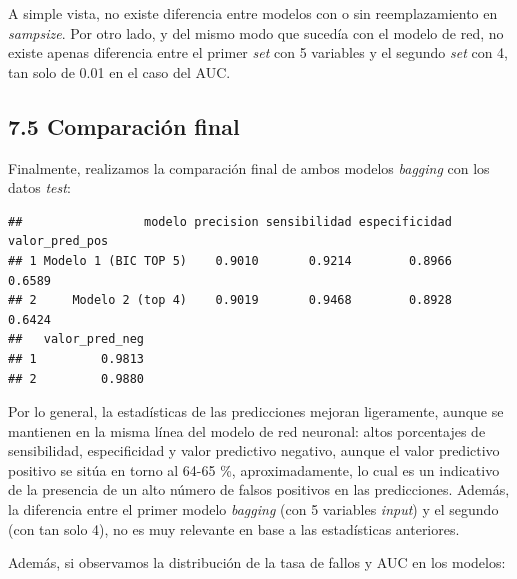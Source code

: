 \documentclass[
]{article}
\begin{document}
A simple vista, no existe diferencia entre modelos con o sin
reemplazamiento en \emph{sampsize}. Por otro lado, y del mismo modo que
sucedía con el modelo de red, no existe apenas diferencia entre el
primer \emph{set} con 5 variables y el segundo \emph{set} con 4, tan
solo de 0.01 en el caso del AUC.

\hypertarget{comparaciuxf3n-final-1}{%
\subsection{7.5 Comparación final}\label{comparaciuxf3n-final-1}}

Finalmente, realizamos la comparación final de ambos modelos
\emph{bagging} con los datos \emph{test}:

\begin{verbatim}
##                 modelo precision sensibilidad especificidad valor_pred_pos
## 1 Modelo 1 (BIC TOP 5)    0.9010       0.9214        0.8966         0.6589
## 2     Modelo 2 (top 4)    0.9019       0.9468        0.8928         0.6424
##   valor_pred_neg
## 1         0.9813
## 2         0.9880
\end{verbatim}

Por lo general, la estadísticas de las predicciones mejoran ligeramente,
aunque se mantienen en la misma línea del modelo de red neuronal: altos
porcentajes de sensibilidad, especificidad y valor predictivo negativo,
aunque el valor predictivo positivo se sitúa en torno al 64-65 \%,
aproximadamente, lo cual es un indicativo de la presencia de un alto
número de falsos positivos en las predicciones. Además, la diferencia
entre el primer modelo \emph{bagging} (con 5 variables \emph{input}) y
el segundo (con tan solo 4), no es muy relevante en base a las
estadísticas anteriores.

Además, si observamos la distribución de la tasa de fallos y AUC en los
modelos:
\end{document}
